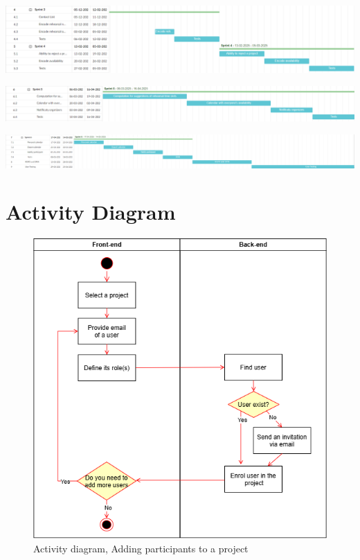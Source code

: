 \documentclass[11pt]{article}
\begin{document}
\vspace{1cm}
\hspace{-1.5cm}
\includegraphics[scale=0.75]{g3.png} 

\vspace{1cm}
\hspace{-1.5cm}
\includegraphics[scale=0.71]{g4.png} 

\vspace{1cm}
\hspace{-1.5cm}
\includegraphics[scale=0.5]{g5.png} 


\vspace{1.5cm}

\section{Activity Diagram}

\begin{figure}[htbp!]
    \centering
    \includegraphics[scale=0.48]{addingusers.drawio.png}
    \caption{Activity diagram, Adding participants to a project}
\end{figure}
\end{document}

